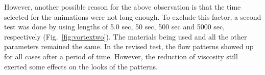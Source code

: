 \documentclass[12pt]{article}
\numberwithin{figure}{section}  %
\numberwithin{equation}{section}  %
\begin{document}
\begin{multicols}{2}
However, another possible reason for the above observation is that the time selected for the animations were not long enough. To exclude this factor, a second test was done by using lengths of 5.0 sec, 50 sec, 500 sec and 5000 sec, respectively (Fig.\ \ref{fig:vortextwo}). The materials being used and all the other parameters remained the same. In the revised test, the flow patterns showed up for all cases after a period of time. However, the reduction of viscosity still exerted some effects on the looks of the patterns.

\begin{figure}[!htb]
	\centering
\end{figure}
\end{multicols}
\end{document}
